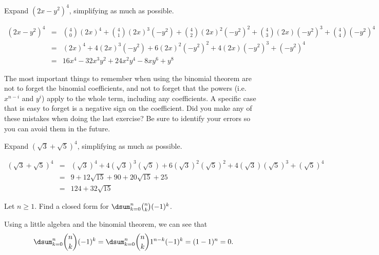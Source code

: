 \begin{exer}
Expand $(2x - y^2)^4$, simplifying as much as possible.
\vspace*{3in}
\begin{answer}
\begin{eqnarray*}
(2x - y^2)^4 &\!\! = & \!\!\!\! \binom{4}{0}(2x)^4 + \binom{4}{1}(2x)^3(-y^2) + \binom{4}{2}(2x)^2(-y^2)^2 + \binom{4}{3}(2x)(-y^2)^3 + \binom{4}{4}(-y^2)^4 \\
 & = & (2x)^4 + 4(2x)^3(-y^2) + 6(2x)^2(-y^2)^2 + 4(2x)(-y^2)^3 + (-y^2)^4 \\
& = & 16x^4 - 32x^3y^2 + 24x^2y^4 - 8xy^6 + y^8
\end{eqnarray*}
\end{answer}
\end{exer}

The most important things to remember when using the binomial theorem are not to forget the binomial
coefficients, and not to forget that the powers (i.e. $x^{n-i}$ and $y^i$) apply to the whole term,
including any coefficients.  
A specific case that is easy to forget is a negative sign on the coefficient.
Did you make any of these mistakes when doing the last exercise?  Be sure to identify your
errors so you can avoid them in the future.

\begin{exer}
Expand $(\sqrt{3} + \sqrt{5})^4$, simplifying as much as possible.
\vspace*{3in}
\begin{answer}
$$
\begin{array}{lll}
(\sqrt{3} + \sqrt{5})^4 & = & (\sqrt{3})^4 +
4(\sqrt{3})^3(\sqrt{5})  + 6(\sqrt{3})^2(\sqrt{5})^2
+ 4(\sqrt{3})(\sqrt{5})^3 + (\sqrt{5})^4 \\
& = & 9 + 12\sqrt{15} + 90 +  20\sqrt{15} + 25 \\
& = & 124 + 32\sqrt{15}
\end{array}
$$
\end{answer}
\end{exer}

\begin{exa}Let $n \geq 1$.
Find a closed form for $\dsum_{k=0}^{n} \binom{n}{k}(-1)^k$.
\begin{sol}
Using a little algebra and the binomial theorem,  we can see that 
$$\dsum_{k=0}^{n} \binom{n}{k}(-1)^k
=\dsum_{k=0}^{n} \binom{n}{k}1^{n-k}(-1)^k
=(1-1)^n
=0.$$

\vspace*{0in}
\end{sol}
\end{exa}

